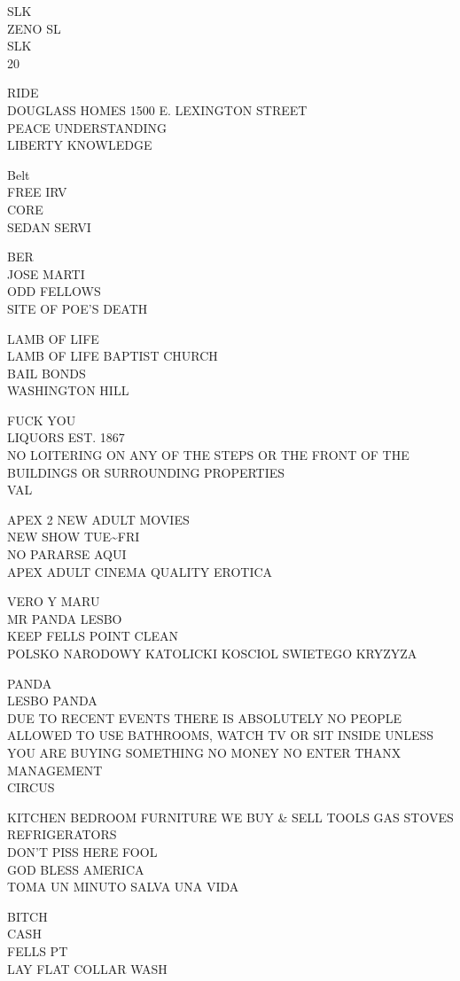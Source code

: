 \documentclass[10pt,letterpaper]{article}
\begin{document}
SLK\\
ZENO SL\\
SLK\\
20

RIDE\\
DOUGLASS HOMES 1500 E. LEXINGTON STREET\\
PEACE UNDERSTANDING\\
LIBERTY KNOWLEDGE

Belt\\
FREE IRV\\
CORE\\
SEDAN SERVI

BER\\
JOSE MARTI\\
ODD FELLOWS\\
SITE OF POE'S DEATH

LAMB OF LIFE\\
LAMB OF LIFE BAPTIST CHURCH\\
BAIL BONDS\\
WASHINGTON HILL

FUCK YOU\\
LIQUORS EST. 1867\\
NO LOITERING ON ANY OF THE STEPS OR THE FRONT OF THE BUILDINGS OR SURROUNDING PROPERTIES\\
VAL

APEX 2 NEW ADULT MOVIES\\
NEW SHOW TUE\textasciitilde{}FRI\\
NO PARARSE AQUI\\
APEX ADULT CINEMA QUALITY EROTICA

VERO Y MARU\\
MR PANDA LESBO\\
KEEP FELLS POINT CLEAN\\
POLSKO NARODOWY KATOLICKI KOSCIOL SWIETEGO KRYZYZA

PANDA\\
LESBO PANDA\\
DUE TO RECENT EVENTS THERE IS ABSOLUTELY NO PEOPLE ALLOWED TO USE BATHROOMS, WATCH TV OR SIT INSIDE UNLESS YOU ARE BUYING SOMETHING NO MONEY NO ENTER THANX MANAGEMENT\\
CIRCUS

KITCHEN BEDROOM FURNITURE WE BUY \& SELL TOOLS GAS STOVES REFRIGERATORS\\
DON'T PISS HERE FOOL\\
GOD BLESS AMERICA\\
TOMA UN MINUTO SALVA UNA VIDA

BITCH\\
CASH\\
FELLS PT\\
LAY FLAT COLLAR WASH
\end{document}
